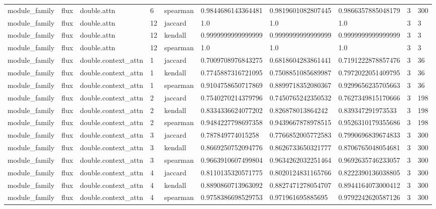 \begin{tabular}{llllllllll}
module\_family & flux & double.attn & 6 & spearman & 0.9844686143364481 & 0.9819601082807445 & 0.9866357885048179 & 3 & 300 \\
module\_family & flux & double.attn & 12 & jaccard & 1.0 & 1.0 & 1.0 & 3 & 3 \\
module\_family & flux & double.attn & 12 & kendall & 0.9999999999999999 & 0.9999999999999999 & 0.9999999999999999 & 3 & 3 \\
module\_family & flux & double.attn & 12 & spearman & 1.0 & 1.0 & 1.0 & 3 & 3 \\
module\_family & flux & double.context\_attn & 1 & jaccard & 0.7009708976843275 & 0.6818604283861441 & 0.7191222878857476 & 3 & 36 \\
module\_family & flux & double.context\_attn & 1 & kendall & 0.7745887316721095 & 0.7508851085689987 & 0.7972022051409795 & 3 & 36 \\
module\_family & flux & double.context\_attn & 1 & spearman & 0.9104758650717869 & 0.8899718352080367 & 0.9299656235705663 & 3 & 36 \\
module\_family & flux & double.context\_attn & 2 & jaccard & 0.7540270214379796 & 0.7450765242350532 & 0.7627349815170666 & 3 & 198 \\
module\_family & flux & double.context\_attn & 2 & kendall & 0.8334336624077202 & 0.826878013864242 & 0.839347291973533 & 3 & 198 \\
module\_family & flux & double.context\_attn & 2 & spearman & 0.9484227798697358 & 0.9439667878978515 & 0.9526310179355686 & 3 & 198 \\
module\_family & flux & double.context\_attn & 3 & jaccard & 0.787849774015258 & 0.7766852005772583 & 0.7990696839674833 & 3 & 300 \\
module\_family & flux & double.context\_attn & 3 & kendall & 0.8669250752094776 & 0.8626733650321777 & 0.8706765048054681 & 3 & 300 \\
module\_family & flux & double.context\_attn & 3 & spearman & 0.9663910607499804 & 0.9634262032251464 & 0.9692635746233057 & 3 & 300 \\
module\_family & flux & double.context\_attn & 4 & jaccard & 0.8110135320571775 & 0.8020124831165766 & 0.8222390136038805 & 3 & 300 \\
module\_family & flux & double.context\_attn & 4 & kendall & 0.8890860713963092 & 0.8827471278054707 & 0.8944164073000412 & 3 & 300 \\
module\_family & flux & double.context\_attn & 4 & spearman & 0.9758386698529753 & 0.971961695885695 & 0.9792242620587126 & 3 & 300 \\

\end{tabular}
